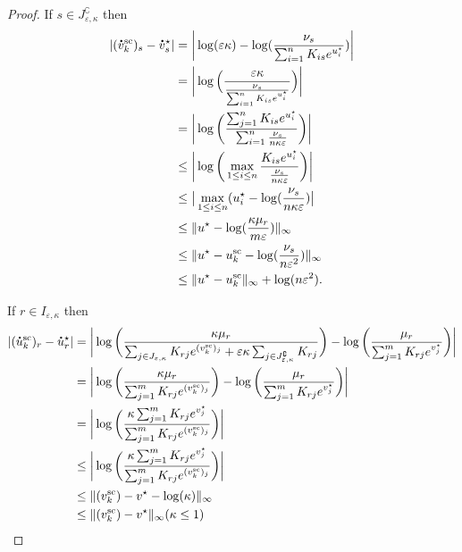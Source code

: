 \begin{proof}
If $s \in J^\complement_{\varepsilon, \kappa}$ then 
\begin{align*}
|(\dt{v}^{\text{sc}}_k)_{s} - \dt{v}^\star_s| &= \bigg| \log(\varepsilon\kappa) - \log(\frac{\nu_s}{\sum_{i=1}^n K_{is}e^{u^\star_i}})\bigg|\\
&= \bigg|\log\Big(\frac{\varepsilon\kappa}{\frac{\nu_s}{\sum_{i=1}^n K_{is}e^{u^\star_i}}}\Big) \bigg|\\
&= \bigg|\log\bigg(\frac{\sum_{j=1}^n K_{is}e^{u^\star_i}}{\sum_{i=1}^n \frac{\nu_s}{n\kappa\varepsilon}}\bigg) \bigg|\\
& \leq \bigg|\log\bigg(\max_{1\leq i \leq n} \frac{K_{is}e^{u^\star_i}}{\frac{\nu_s}{n\kappa\varepsilon}}\bigg) \bigg|\\
& \leq \big|\max_{1\leq i \leq n} (u_i^\star - \log(\frac{\nu_s}{n\kappa\varepsilon})\big|\\
& \leq \norm{u^\star - \log(\frac{\kappa \mu_r}{m\varepsilon})}_\infty \\
& \leq \norm{u^\star - u^{\text{sc}}_k - \log(\frac{\nu_s}{n\varepsilon^2})}_\infty \\
& \leq \norm{u^\star - u^{\text{sc}}_k}_\infty +  \log(n\varepsilon^2).
\end{align*}

If $r \in I_{\varepsilon, \kappa}$ then 
\begin{align*}
|(\dt{u}^{\text{sc}}_k)_{r} - \dt{u}^\star_r| &= \bigg|\log\bigg(\frac{\kappa\mu_r}{\sum_{j\in J_{\varepsilon,\kappa}}K_{rj}e^{(v^{\text{sc}}_k)_j} + \varepsilon\kappa \sum_{j\in J^\complement_{\varepsilon,\kappa}}K_{rj}}\bigg) - \log\bigg(\frac{\mu_r}{\sum_{j=1}^m K_{rj}e^{v^\star_j}}\bigg)\bigg|\\
&= \bigg|\log\bigg(\frac{\kappa\mu_r}{\sum_{j=1}^m K_{rj}e^{(v^{\text{sc}}_k)_j}}\bigg) - \log\bigg(\frac{\mu_r}{\sum_{j=1}^m K_{rj}e^{v^\star_j}}\bigg)\bigg|\\
&= \bigg|\log\bigg(\frac{\kappa\sum_{j=1}^m K_{rj}e^{v^\star_j}}{\sum_{j=1}^m K_{rj}e^{(v^{\text{sc}}_k)_j}}\bigg)\bigg|\\
& \leq \bigg|\log\bigg(\frac{\kappa\sum_{j=1}^m K_{rj}e^{v^\star_j}}{\sum_{j=1}^m K_{rj}e^{(v^{\text{sc}}_k)_j}}\bigg)\bigg|\\
& \leq \norm{(v^{\text{sc}}_k) - v^\star - \log(\kappa)}_\infty\\
& \leq \norm{(v^{\text{sc}}_k) - v^\star}_\infty (\kappa \leq 1)
\end{align*}



\end{proof}
